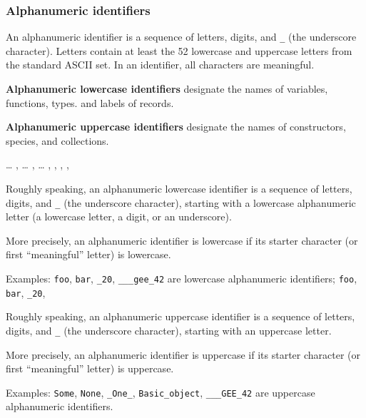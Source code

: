 \subsubsection{Alphanumeric identifiers}

An alphanumeric identifier is a sequence of letters, digits, and
{\tt \_} (the underscore character).
Letters contain at least the 52 lowercase and uppercase letters from the
standard ASCII set. In an identifier, all characters are meaningful.

{\bf Alphanumeric lowercase identifiers} designate the names of variables, functions,
types. and labels of records.

{\bf Alphanumeric uppercase identifiers} designate the names of constructors, species,
and collections.

\begin{syn}
 \is {} \ldots {}
\sep
{} \is {} \ldots {}
\sep
{} \is {} \ldots {}
\sep
{} \is {} \orelse {}
\sep
{} \is \rep{ \tok{\_}} 
\sep
{} \is \rep{ \tok{\_}} 
\sep
{} \is {} \orelse {}
\end{syn}
\vspace{0.2cm}

Roughly speaking, an alphanumeric lowercase identifier is a sequence of
letters, digits, and {\tt \_} (the underscore character), starting with a
lowercase alphanumeric letter (a lowercase letter, a digit, or an
underscore).

More precisely, an alphanumeric identifier is lowercase if its starter
character (or first ``meaningful'' letter) is lowercase.

Examples: {\tt foo}, {\tt bar}, {\tt \_20},
{\tt \_\_\_gee\_42} are lowercase alphanumeric identifiers;
{\tt foo}, {\tt bar}, {\tt \_20},

Roughly speaking, an alphanumeric uppercase identifier is a sequence of
letters, digits, and {\tt \_} (the underscore character), starting with an
uppercase letter.

More precisely, an alphanumeric identifier is uppercase if its starter
character (or first ``meaningful'' letter) is uppercase.

Examples: {\tt Some}, {\tt None}, {\tt \_One\_}, {\tt Basic\_object},
{\tt \_\_\_GEE\_42} are uppercase alphanumeric identifiers.

